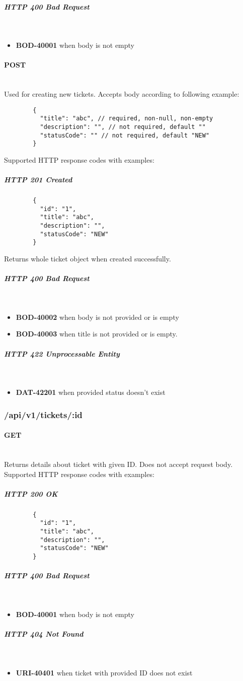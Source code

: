 \documentclass[a4paper]{article}
\newcommand{\newLineParagraph}[1]{\paragraph{#1}\mbox{}\\}
\newcommand{\newLineSubParagraph}[1]{\subparagraph{#1}\mbox{}\\}
\begin{document}
    \newLineSubParagraph{HTTP 400 Bad Request}
    \begin{itemize}
        \item \textbf{BOD-40001} when body is not empty
    \end{itemize}

    \newLineParagraph{POST}
    Used for creating new tickets. Accepts body according to following example:
    \begin{verbatim}
        {
          "title": "abc", // required, non-null, non-empty
          "description": "", // not required, default ""
          "statusCode": "" // not required, default "NEW"
        }
    \end{verbatim}
    Supported HTTP response codes with examples:
    \subparagraph{HTTP 201 Created}
    \begin{verbatim}
        {
          "id": "1",
          "title": "abc",
          "description": "",
          "statusCode": "NEW"
        }
    \end{verbatim}
    Returns whole ticket object when created successfully.

    \newLineSubParagraph{HTTP 400 Bad Request}
    \begin{itemize}
        \item \textbf{BOD-40002} when body is not provided or is empty
        \item \textbf{BOD-40003} when title is not provided or is empty.
    \end{itemize}

    \newLineSubParagraph{HTTP 422 Unprocessable Entity}
    \begin{itemize}
        \item \textbf{DAT-42201} when provided status doesn't exist
    \end{itemize}

    \subsubsection{/api/v1/tickets/:id}
    \newLineParagraph{GET}
    Returns details about ticket with given ID. Does not accept request body. \\
    Supported HTTP response codes with examples:
    \subparagraph{HTTP 200 OK}
    \begin{verbatim}
        {
          "id": "1",
          "title": "abc",
          "description": "",
          "statusCode": "NEW"
        }
    \end{verbatim}
    \newLineSubParagraph{HTTP 400 Bad Request}
    \begin{itemize}
        \item \textbf{BOD-40001} when body is not empty
    \end{itemize}
    \newLineSubParagraph{HTTP 404 Not Found}
    \begin{itemize}
        \item \textbf{URI-40401} when ticket with provided ID does not exist
    \end{itemize}
\end{document}
